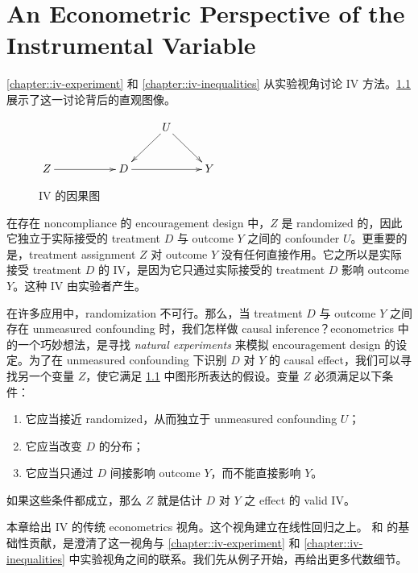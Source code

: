  
\chapter{An Econometric Perspective of the Instrumental Variable}
 \label{chapter::iv-econometric}
 
 
\cref{chapter::iv-experiment} 和 \cref{chapter::iv-inequalities} 从实验视角讨论 IV 方法。\cref{fig::causal-diagram-IV} 展示了这一讨论背后的直观图像。 
 
 
\begin{figure}[h]
\centering 
$
\xymatrix{
 && & U  \ar[dl] \ar[dr] &\\
Z \ar[rr] &&D \ar[rr]&&Y
}
$
\caption{IV 的因果图}\label{fig::causal-diagram-IV}
\end{figure} 
 
 
 
在存在 noncompliance 的 encouragement design 中，$Z$ 是 randomized 的，因此它独立于实际接受的 treatment $D$ 与 outcome $Y$ 之间的 confounder $U$。更重要的是，treatment assignment $Z$ 对 outcome $Y$ 没有任何直接作用。它之所以是实际接受 treatment $D$ 的 IV，是因为它只通过实际接受的 treatment $D$ 影响 outcome $Y$。这种 IV 由实验者产生。 


在许多应用中，randomization 不可行。那么，当 treatment $D$ 与 outcome $Y$ 之间存在 unmeasured confounding 时，我们怎样做 causal inference？econometrics 中的一个巧妙想法，是寻找 {\it natural experiments} 来模拟 encouragement design 的设定。为了在 unmeasured confounding 下识别 $D$ 对 $Y$ 的 causal effect，我们可以寻找另一个变量 $Z$，使它满足 \cref{fig::causal-diagram-IV} 中图形所表达的假设。变量 $Z$ 必须满足以下条件：
\begin{enumerate}
\item
它应当接近 randomized，从而独立于 unmeasured confounding $U$；
\item
它应当改变 $D$ 的分布；
\item
它应当只通过 $D$ 间接影响 outcome $Y$，而不能直接影响 $Y$。
\end{enumerate}
如果这些条件都成立，那么 $Z$ 就是估计 $D$ 对 $Y$ 之 effect 的 valid IV。 



本章给出 IV 的传统 econometrics 视角。这个视角建立在线性回归之上。\citet{imbens1994identification} 和 \citet{angrist1996identification} 的基础性贡献，是澄清了这一视角与 \cref{chapter::iv-experiment} 和 \cref{chapter::iv-inequalities} 中实验视角之间的联系。我们先从例子开始，再给出更多代数细节。 



